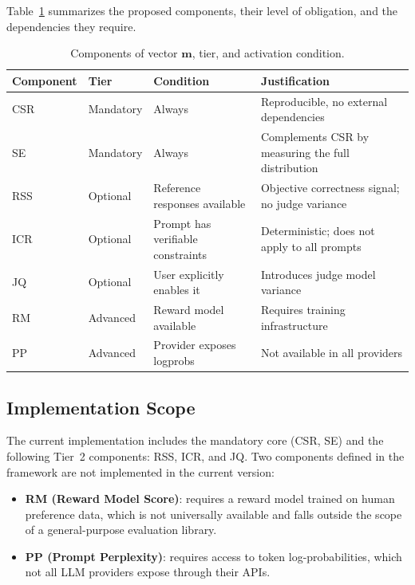 \documentclass[11pt,a4paper]{article}
\begin{document}
Table~\ref{tab:components} summarizes the proposed components, their level of obligation, and the dependencies they require.

\begin{table}[h]
\centering
\caption{Components of vector $\mathbf{m}$, tier, and activation condition.}
\label{tab:components}
\begin{tabular}{lllp{5cm}}
\toprule
Component & Tier & Condition & Justification \\
\midrule
CSR & Mandatory & Always & Reproducible, no external dependencies \\
SE  & Mandatory & Always & Complements CSR by measuring the full distribution \\
RSS & Optional & Reference responses available & Objective correctness signal; no judge variance \\
ICR & Optional & Prompt has verifiable constraints & Deterministic; does not apply to all prompts \\
JQ  & Optional & User explicitly enables it & Introduces judge model variance \\
RM  & Advanced & Reward model available & Requires training infrastructure \\
PP  & Advanced & Provider exposes logprobs & Not available in all providers \\
\bottomrule
\end{tabular}
\end{table}

\subsection{Implementation Scope}

The current implementation includes the mandatory core (CSR, SE) and the following Tier~2 components: RSS, ICR, and JQ. Two components defined in the framework are not implemented in the current version:

\begin{itemize}[noitemsep]
    \item \textbf{RM (Reward Model Score)}: requires a reward model trained on human preference data, which is not universally available and falls outside the scope of a general-purpose evaluation library.
    \item \textbf{PP (Prompt Perplexity)}: requires access to token log-probabilities, which not all LLM providers expose through their APIs.
\end{itemize}
\end{document}
